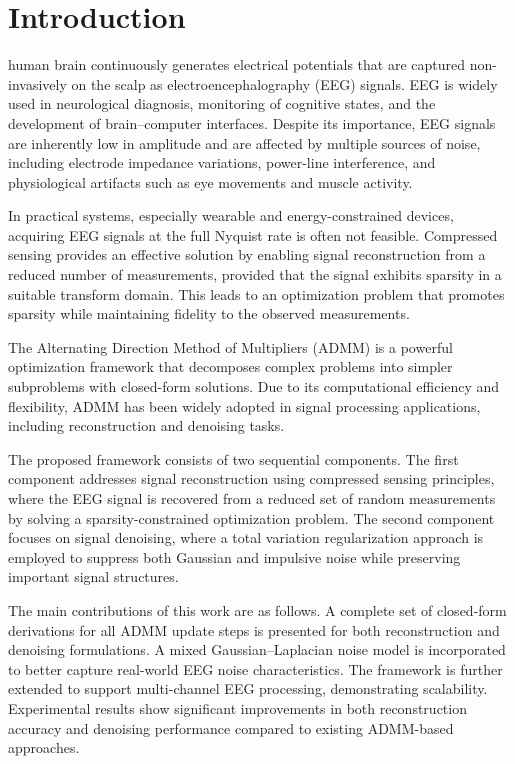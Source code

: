 \documentclass[journal,twoside,10pt]{IEEEtran}
\begin{document}
\section{Introduction}
\label{sec:intro}

 human brain continuously generates electrical potentials that are captured non-invasively on the scalp as electroencephalography (EEG) signals. EEG is widely used in neurological diagnosis, monitoring of cognitive states, and the development of brain--computer interfaces. Despite its importance, EEG signals are inherently low in amplitude and are affected by multiple sources of noise, including electrode impedance variations, power-line interference, and physiological artifacts such as eye movements and muscle activity.

In practical systems, especially wearable and energy-constrained devices, acquiring EEG signals at the full Nyquist rate is often not feasible. Compressed sensing provides an effective solution by enabling signal reconstruction from a reduced number of measurements, provided that the signal exhibits sparsity in a suitable transform domain. This leads to an optimization problem that promotes sparsity while maintaining fidelity to the observed measurements.

The Alternating Direction Method of Multipliers (ADMM) is a powerful optimization framework that decomposes complex problems into simpler subproblems with closed-form solutions. Due to its computational efficiency and flexibility, ADMM has been widely adopted in signal processing applications, including reconstruction and denoising tasks.

The proposed framework consists of two sequential components. The first component addresses signal reconstruction using compressed sensing principles, where the EEG signal is recovered from a reduced set of random measurements by solving a sparsity-constrained optimization problem. The second component focuses on signal denoising, where a total variation regularization approach is employed to suppress both Gaussian and impulsive noise while preserving important signal structures.

The main contributions of this work are as follows. A complete set of closed-form derivations for all ADMM update steps is presented for both reconstruction and denoising formulations. A mixed Gaussian--Laplacian noise model is incorporated to better capture real-world EEG noise characteristics. The framework is further extended to support multi-channel EEG processing, demonstrating scalability. Experimental results show significant improvements in both reconstruction accuracy and denoising performance compared to existing ADMM-based approaches.
\end{document}
